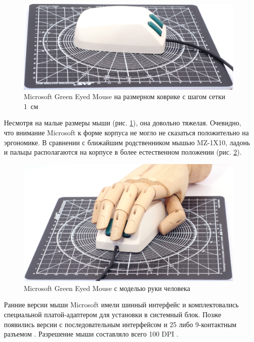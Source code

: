 \documentclass[11pt, a4paper]{article}
\begin{document}
\begin{figure}[h]
    \centering
    \includegraphics[scale=0.5]{1983_microsoft_green_eyed_mouse/size_30.jpg}
    \caption{Microsoft Green Eyed Mouse на размерном коврике с шагом сетки 1~см}
    \label{fig:MicrosoftGreenEyedSize}
\end{figure}

Несмотря на малые размеры мыши (рис. \ref{fig:MicrosoftGreenEyedSize}), она довольно тяжелая. Очевидно, что внимание Microsoft к форме корпуса не могло не сказаться положительно на эргономике. В сравнении с ближайшим родственником мышью MZ-1X10, ладонь и пальцы располагаются на корпусе в более естественном положении (рис. \ref{fig:MicrosoftGreenEyedHand}).

\begin{figure}[h]
    \centering
    \includegraphics[scale=0.5]{1983_microsoft_green_eyed_mouse/hand_30.jpg}
    \caption{Microsoft Green Eyed Mouse с моделью руки человека}
    \label{fig:MicrosoftGreenEyedHand}
\end{figure}

Ранние версии мыши Microsoft имели шинный интерфейс и комплектовались специальной платой-адаптером для установки в системный блок. Позже появились версии с последовательным интерфейсом и 25 либо 9-контактным разъемом \cite{mouses}. Разрешение мыши составляло всего 100 DPI \cite{review}.
\end{document}
